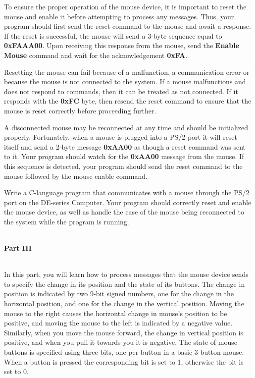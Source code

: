 \documentclass[epsfig,10pt,fullpage]{article}
\begin{document}
To ensure the proper operation of the mouse device, it is important to reset the mouse and enable it before attempting to process any messages. Thus, your program should first send the reset command to the mouse and await a response. If the reset is successful, the mouse will send a 3-byte sequence equal to {\bf 0xFAAA00}. Upon receiving this response from the mouse, send the {\bf Enable Mouse} command and wait for the acknowledgement {\bf 0xFA}.

Resetting the mouse can fail because of a malfunction, a communication error or because the mouse is not connected to the system. If a mouse malfunctions and does not respond to commands, then it can be treated as not connected. If it responds with the {\bf 0xFC} byte, then resend the reset command to ensure that the mouse is reset correctly before proceeding further.

A disconnected mouse may be reconnected at any time and should be initialized properly. Fortunately, when a mouse is plugged into a PS/2 port it will reset itself and send a 2-byte message {\bf 0xAA00} as though a reset command was sent to it. Your program should watch for the {\bf 0xAA00} message from the mouse. If this sequence is detected, your program should send the reset command to the mouse followed by the mouse enable command.

Write a C-language program that communicates with a mouse through the PS/2 port on the DE-series Computer. Your program should correctly reset and enable the mouse device, as well as handle the case of the mouse being reconnected to the system while the program is running.

~\\
\noindent
{\bf Part III}

~\\
\noindent
In this part, you will learn how to process messages that the mouse device sends to specify the change in its position and the state of its buttons. The change in position is indicated by two 9-bit signed numbers, one for the change in the horizontal position, and one for the change in the vertical position. Moving the mouse to the right causes the horizontal change in mouse's position to be positive, and moving the mouse to the left is indicated by a negative value. Similarly, when you move
the mouse forward, the change in vertical position is positive, and when you pull it towards you it is negative. The state of
mouse buttons is specified using three bits, one per button in a basic 3-button mouse. When a button is pressed the corresponding bit is set to 1, otherwise the bit is set to 0.
\end{document}
